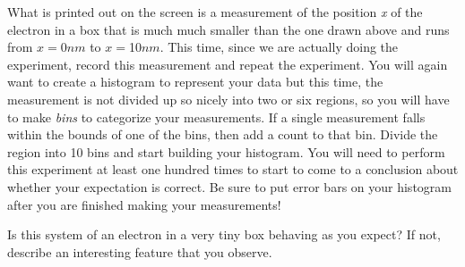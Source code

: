 \documentclass[12pt]{article}
\begin{document}
What is printed out on the screen is a measurement of the position \textit{x} of the electron in a box that is much much smaller than the one drawn above and runs from $x=$0$nm$ to $x=$10$nm$.  This time, since we are actually doing the experiment, record this measurement and repeat the experiment.  You will again want to create a histogram to represent your data but this time, the measurement is not divided up so nicely into two or six regions, so you will have to make \textit{bins} to categorize your measurements.  If a single measurement falls within the bounds of one of the bins, then add a count to that bin.  Divide the region into 10 bins and start building your histogram.  You will need to perform this experiment at least one hundred times to start to come to a conclusion about whether your expectation is correct.  Be sure to put error bars on your histogram after you are finished making your measurements!

Is this system of an electron in a very tiny box behaving as you expect?  If not, describe an interesting feature that you observe.  
\end{document}
